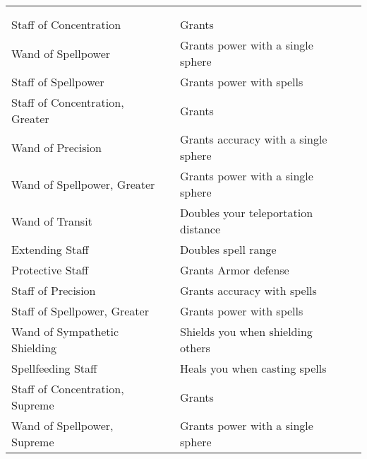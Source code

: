 
\begin{longtabuwrapper}
\begin{longtabu}{l l X l}
 \\
 &  &  &  \\
\bottomrule
Staff of Concentration &  & Grants   & \pageref{item:Staff of Concentration} \\
Wand of Spellpower &  & Grants  power with a single sphere & \pageref{item:Wand of Spellpower} \\
Staff of Spellpower &  & Grants  power with spells & \pageref{item:Staff of Spellpower} \\
Staff of Concentration, Greater &  & Grants   & \pageref{item:Staff of Concentration, Greater} \\
Wand of Precision &  & Grants  accuracy with a single sphere & \pageref{item:Wand of Precision} \\
Wand of Spellpower, Greater &  & Grants  power with a single sphere & \pageref{item:Wand of Spellpower, Greater} \\
Wand of Transit &  & Doubles your teleportation distance & \pageref{item:Wand of Transit} \\
Extending Staff &  & Doubles spell range & \pageref{item:Extending Staff} \\
Protective Staff &  & Grants  Armor defense & \pageref{item:Protective Staff} \\
Staff of Precision &  & Grants  accuracy with spells & \pageref{item:Staff of Precision} \\
Staff of Spellpower, Greater &  & Grants  power with spells & \pageref{item:Staff of Spellpower, Greater} \\
Wand of Sympathetic Shielding &  & Shields you when shielding others & \pageref{item:Wand of Sympathetic Shielding} \\
Spellfeeding Staff &  & Heals you when casting spells & \pageref{item:Spellfeeding Staff} \\
Staff of Concentration, Supreme &  & Grants   & \pageref{item:Staff of Concentration, Supreme} \\
Wand of Spellpower, Supreme &  & Grants  power with a single sphere & \pageref{item:Wand of Spellpower, Supreme} \\

\end{longtabu}
\end{longtabuwrapper}

